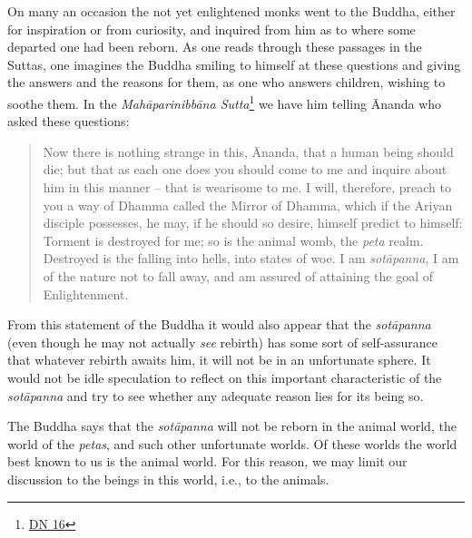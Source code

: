 On many an occasion the not yet enlightened monks went to the Buddha, either for inspiration or from curiosity, and inquired from him as to where some departed one had been reborn. As one reads through these passages in the Suttas, one imagines the Buddha smiling to himself at these questions and giving the answers and the reasons for them, as one who answers children, wishing to soothe them. In the \textit{Mahāparinibbāna Sutta}\footnote{\href{https://suttacentral.net/dn16/en/bodhi}{DN 16}} we have him telling Ānanda who asked these questions:

\begin{quote}
Now there is nothing strange in this, Ānanda, that a human being should die; but that as each one does you should come to me and inquire about him in this manner -- that is wearisome to me. I will, therefore, preach to you a way of Dhamma called the Mirror of Dhamma, which if the Ariyan disciple possesses, he may, if he should so desire, himself predict to himself: Torment is destroyed for me; so is the animal womb, the \textit{peta} realm. Destroyed is the falling into hells, into states of woe. I am \textit{sotāpanna}, I am of the nature not to fall away, and am assured of attaining the goal of Enlightenment.
\end{quote}

From this statement of the Buddha it would also appear that the \textit{sotāpanna} (even though he may not actually \emph{see} rebirth) has some sort of self-assurance that whatever rebirth awaits him, it will not be in an unfortunate sphere. It would not be idle speculation to reflect on this important characteristic of the \textit{sotāpanna} and try to see whether any adequate reason lies for its being so.

The Buddha says that the \textit{sotāpanna} will not be reborn in the animal world, the world of the \textit{petas}, and such other unfortunate worlds. Of these worlds the world best known to us is the animal world. For this reason, we may limit our discussion to the beings in this world, i.e., to the animals.

